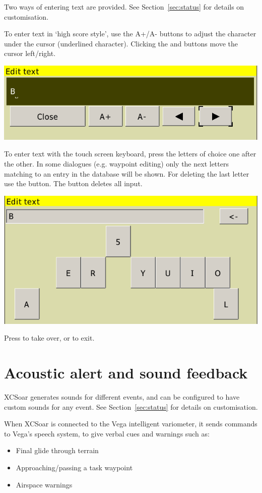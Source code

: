 Two ways of entering text are provided. See Section~\ref{sec:status} for 
details on customisation.

To enter text in `high score style', use the A+/A- buttons to adjust the 
character under the cursor (underlined character). Clicking the \button{$<$} 
and \button{$>$} buttons move the cursor left/right.  

\begin{center}
\includegraphics[angle=0,width=0.6\linewidth,keepaspectratio='true']{figures/textentry.png}
\end{center}

To enter text with the touch screen keyboard, press the letters of choice 
one after the other. In some dialogues (e.g. waypoint editing) only the next 
letters matching to an entry in the database will be shown. For deleting the 
last letter use the \button{$<-$} button. The  button deletes all input.

\begin{center}
\includegraphics[angle=0,width=0.6\linewidth,keepaspectratio='true']{figures/textentry_keyboard.png}
\end{center}

Press  to take over, or  to exit.

\section{Acoustic alert and sound feedback}

XCSoar generates sounds for different events, and can be configured to
have custom sounds for any event.  See Section~\ref{sec:status} for
details on customisation.

When XCSoar is connected to the Vega intelligent variometer, it sends
commands to Vega's speech system, to give verbal cues and warnings such as:
\begin{itemize}
\item Final glide through terrain
\item Approaching/passing a task waypoint
\item Airspace warnings
\end{itemize}

